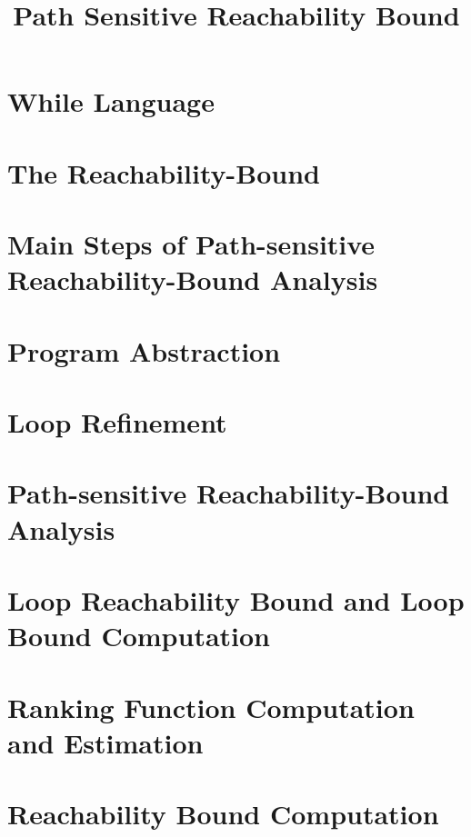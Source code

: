 \documentclass[a4paper,11pt]{article}
\begin{document}
\title{Path Sensitive Reachability Bound}

\author{}

\date{}

\maketitle
%
\tableofcontents

% 
\section{{While Language}}
\label{sec:language}

\section{{The Reachability-Bound}}
\label{sec:execution_rb}

\section{Main Steps of Path-sensitive Reachability-Bound Analysis}
\label{sec:static_rb}

\section{Program Abstraction}
\label{sec:progabs}

\section{Loop Refinement}
\label{sec:refine}

\section{Path-sensitive Reachability-Bound Analysis}
\label{sec:psrb}

  
\section{Loop Reachability Bound and Loop Bound Computation}
\label{sec:looprb}

\section{Ranking Function Computation and Estimation}
\label{sec:outinalg}

\section{Reachability Bound Computation}
\label{sec:alg-rb}

\end{document}
